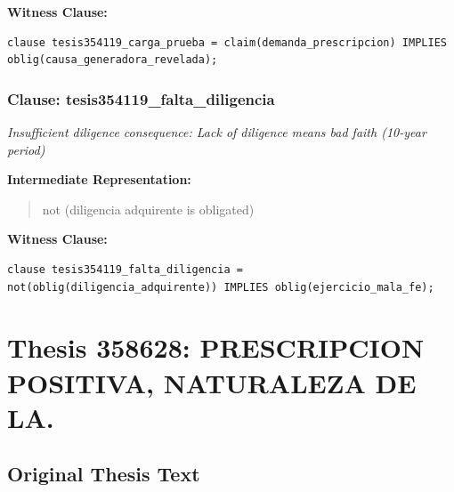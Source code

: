 \documentclass[11pt,a4paper]{article}
\begin{document}
\textbf{Witness Clause:}

\begin{lstlisting}[style=witnessstyle, language=Witness]
clause tesis354119_carga_prueba = claim(demanda_prescripcion) IMPLIES oblig(causa_generadora_revelada);
\end{lstlisting}

\subsubsection{Clause: tesis354119\_falta\_diligencia}

\textit{Insufficient diligence consequence: Lack of diligence means bad faith (10-year period)}

\textbf{Intermediate Representation:}

\begin{quote}
not (diligencia adquirente is obligated)
\end{quote}

\textbf{Witness Clause:}

\begin{lstlisting}[style=witnessstyle, language=Witness]
clause tesis354119_falta_diligencia = not(oblig(diligencia_adquirente)) IMPLIES oblig(ejercicio_mala_fe);
\end{lstlisting}

\newpage

\section{Thesis 358628: PRESCRIPCION POSITIVA, NATURALEZA DE LA.}
\label{thesis:358628}

\subsection{Original Thesis Text}
\end{document}
